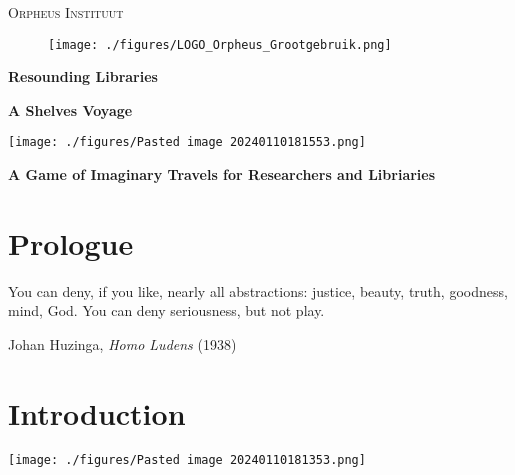 \documentclass[12pt,a4paper]{book}
\theoremstyle{definition}
\begin{document}
\setcounter{chapter}{1}

\begin{titlepage}
\begin{center}
\vspace{1cm}
{{\Large{\textsc{Orpheus Instituut \\}}}}
\vspace{1cm}
\begin{figure}[h!]
\begin{center}
\texttt{[image: ./figures/LOGO\_Orpheus\_Grootgebruik.png]}%
\end{center}
\end{figure}
{\LARGE{\bf Resounding Libraries}}
\end{center}
\vspace{3 mm}
\begin{center}
{\Huge{\bf A Shelves Voyage }}\\
\begin{center}
\texttt{[image: ./figures/Pasted image 20240110181553.png]}
\end{center}
\vspace{3mm}
{\large{\bf A Game of Imaginary Travels for Researchers and Libriaries }}\\

\end{center}


\end{titlepage}

\newpage
{}
\setcounter{tocdepth}{3}
\tableofcontents
\newpage

\section*{Prologue}

\epigraph{
You can deny, if you like, nearly all
abstractions: justice, beauty, truth, goodness, mind, God. You
can deny seriousness, but not play.}
{Johan Huzinga, \textit{Homo Ludens} (1938)}


\newpage


\section{Introduction}

\begin{center}
\texttt{[image: ./figures/Pasted image 20240110181353.png]}
\end{center}
\end{document}
